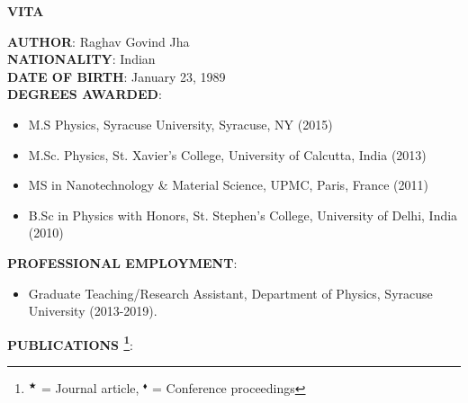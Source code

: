 \thispagestyle{empty}
\begin{center}
{\large {\bf VITA}}
\end{center}
\vspace{1cm}
{\bf AUTHOR}: Raghav Govind Jha \\
{\bf NATIONALITY}: Indian \\
{\bf DATE OF BIRTH}: January 23, 1989 \\
{\bf DEGREES AWARDED}:
\begin{itemize}
\item M.S Physics, Syracuse University, Syracuse, NY  (2015)
\item M.Sc. Physics, St. Xavier's College, University of Calcutta, India (2013) 
\item MS in Nanotechnology \& Material Science, UPMC, Paris, France (2011) 
\item B.Sc in Physics with Honors, St. Stephen's College, University of Delhi, India (2010) 
\end{itemize}
{\bf PROFESSIONAL EMPLOYMENT}:
\begin{itemize}
\item[] Graduate Teaching/Research Assistant, Department of Physics, Syracuse University (2013-2019).
\end{itemize}
{\bf PUBLICATIONS \footnote{$^{\bigstar}$ = Journal article, $^{\blacklozenge}$ = Conference proceedings}}:

